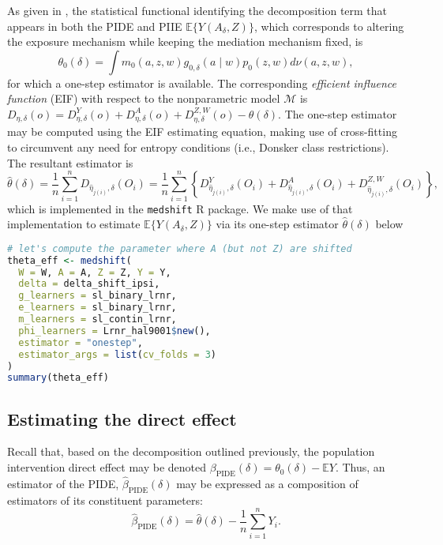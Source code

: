 \documentclass[
  12pt,
]{book}
\newcommand{\passthrough}[1]{#1}
\theoremstyle{definition}
\theoremstyle{definition}
\theoremstyle{definition}
\newcommand{\1}{\mathbbm{1}}
\begin{document}
As given in \citet{diaz2020causal}, the statistical functional identifying the
decomposition term that appears in both the PIDE and PIIE
\(\mathbb{E}\{Y(A_{\delta}, Z)\}\), which corresponds to altering the exposure
mechanism while keeping the mediation mechanism fixed, is
\begin{equation*}
  \theta_0(\delta) = \int m_0(a, z, w) g_{0,\delta}(a \mid w) p_0(z, w)
    d\nu(a, z, w),
\end{equation*}
for which a one-step estimator is available. The corresponding \emph{efficient
influence function} (EIF) with respect to the nonparametric model \(\mathcal{M}\)
is \(D_{\eta,\delta}(o) = D^Y_{\eta,\delta}(o) + D^A_{\eta,\delta}(o) + D^{Z,W}_{\eta,\delta}(o) - \theta(\delta)\). The
one-step estimator may be computed using the EIF estimating equation, making use
of cross-fitting \citep{zheng2011cross, chernozhukov2018double} to circumvent any
need for entropy conditions (i.e., Donsker class restrictions). The resultant
estimator is
\begin{equation*}
  \hat{\theta}(\delta) = \frac{1}{n} \sum_{i = 1}^n D_{\hat{\eta}_{j(i)},
  \delta}(O_i) = \frac{1}{n} \sum_{i = 1}^n \left\{ D^Y_{\hat{\eta}_{j(i)},
  \delta}(O_i) + D^A_{\hat{\eta}_{j(i)}, \delta}(O_i) +
  D^{Z,W}_{\hat{\eta}_{j(i)}, \delta}(O_i) \right\},
\end{equation*}
which is implemented in the \passthrough{\lstinline!medshift!} R package. We make use of that
implementation to estimate \(\mathbb{E}\{Y(A_{\delta}, Z)\}\) via its one-step
estimator \(\hat{\theta}(\delta)\) below

\begin{lstlisting}[language=R]
# let's compute the parameter where A (but not Z) are shifted
theta_eff <- medshift(
  W = W, A = A, Z = Z, Y = Y,
  delta = delta_shift_ipsi,
  g_learners = sl_binary_lrnr,
  e_learners = sl_binary_lrnr,
  m_learners = sl_contin_lrnr,
  phi_learners = Lrnr_hal9001$new(),
  estimator = "onestep",
  estimator_args = list(cv_folds = 3)
)
summary(theta_eff)
\end{lstlisting}

\hypertarget{estimating-the-direct-effect}{%
\subsection{Estimating the direct effect}\label{estimating-the-direct-effect}}

Recall that, based on the decomposition outlined previously, the population
intervention direct effect may be denoted \(\beta_{\text{PIDE}}(\delta) = \theta_0(\delta) - \mathbb{E}Y\). Thus, an estimator of the PIDE,
\(\hat{\beta}_{\text{PIDE}}(\delta)\) may be expressed as a composition of
estimators of its constituent parameters:
\begin{equation*}
  \hat{\beta}_{\text{PIDE}}({\delta}) = \hat{\theta}(\delta) -
  \frac{1}{n} \sum_{i = 1}^n Y_i.
\end{equation*}
\end{document}
